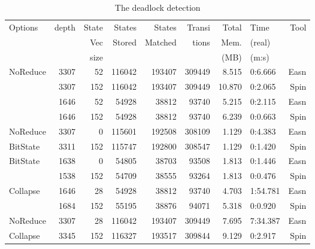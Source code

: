 \documentclass{entcs} \usepackage{entcsmacro}
\begin{document}
\begin{table}[ht]
\caption{The deadlock detection}
\begin{center}
\begin{tabular}{||l|r|r|r|r|r|r|l|r||}
\hline
Options & depth & State & States & States  & Transi & Total & Time   & Tool\\
        &       & Vec   & Stored & Matched &  tions & Mem.  & (real)   &     \\
        &       & size  &        &         &        & (MB)  & (m:s)  &       \\
\hline
NoReduce & 3307 & 52& 116042& 193407& 309449& 8.515& 0:6.666 &Easn\\ %
 & 3307& 152& 116042& 193407& 309449& 10.870& 0:2.065&  Spin\\ \hline
 & 1646& 52& 54928& 38812& 93740& 5.215& 0:2.115& Easn\\ %
 & 1646& 152& 54928& 38812& 93740& 6.239& 0:0.663&  Spin\\ \hline
NoReduce & 3307& 0& 115601& 192508& 308109& 1.129& 0:4.383& Easn\\ %
 BitState & 3311& 152& 115747& 192800& 308547& 1.129& 0:1.420&  Spin\\ \hline
 BitState & 1638& 0& 54805& 38703& 93508& 1.813& 0:1.446& Easn\\ %
 & 1538& 152& 54709& 38555& 93264& 1.813& 0:0.476&  Spin\\ \hline
 Collapse & 1646& 28& 54928& 38812& 93740& 4.703& 1:54.781 &Easn\\ %
& 1684& 152& 55195& 38876& 94071& 5.318& 0:0.920& Spin\\ \hline
 NoReduce & 3307& 28& 116042& 193407& 309449& 7.695& 7:34.387& Easn\\ %
 Collapse & 3345& 152& 116327& 193517& 309844& 9.129& 0:2.917& Spin\\
\hline
\end{tabular}
\end{center}
\end{table}
\end{document}
